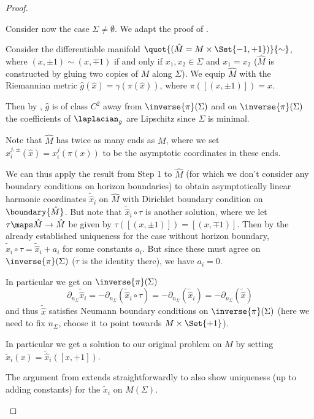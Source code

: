 \documentclass[titlepage,numbers=noenddot,headinclude,oneside,%
footinclude=true,cleardoublepage=empty,%
BCOR=5mm,paper=a4,fontsize=11pt,%
english,%
]{scrartcl}
\begin{document}
\begin{proof}
\begin{proofenumerate}[label=\textbf{Step \arabic*.}]
        \item Consider now the case \( \Sigma\neq \emptyset \). We adapt the proof of \cite[Proposition 46]{eichmairDoublingAsymptoticallyFlat2023}.

        Consider the differentiable manifold \( \quot{(\hat{M}=M\times \Set{-1,+1})}{\sim} \), where \( (x,\pm 1)\sim (x,\mp 1) \) if and only if \( x_1,x_2\in \Sigma \) and \( x_1=x_2 \) (\ie \( \hat{M} \) is constructed by gluing two copies of \( M \) along \( \Sigma \)). We equip \( \hat{M} \) with the Riemannian metric \( \hat{g}(\hat{x})=\gamma(\pi(\hat{x})) \), where \( \pi([(x,\pm 1)])=x \).
        
        Then by \cite[Lemma 19]{eichmairDoublingAsymptoticallyFlat2023}, \( \hat{g} \) is of class \( C^2 \) away from \( \inverse{\pi}(\Sigma) \) and on \( \inverse{\pi}(\Sigma) \) the coefficients of \( \laplacian_{\tilde{g}} \) are Lipschitz since \( \Sigma \) is minimal.

        Note that \( \hat{M} \) has twice as many ends as \( M \), where we set \( \hat{x}_{i}^{j,\pm}(\hat{x})=x_i^j(\pi(x)) \) to be the asymptotic coordinates in these ends.

        We can thus apply the result from Step 1 to \( \hat{M} \) (for which we don't consider any boundary conditions on horizon boundaries) to obtain asymptotically linear harmonic coordinates \( \tilde{\hat{x}}_i \) on \( \hat{M} \) with Dirichlet boundary condition on \( \boundary{\hat{M}} \). But note that \( \tilde{\hat{x}}_i\circ \tau \) is another solution, where we let \( \tau\maps \hat{M}\to \hat{M} \) be given by \( \tau([(x,\pm 1)])=[(x,\mp 1)] \). Then by the already established uniqueness for the case without horizon boundary, \( \tilde{\hat{x}}_i\circ \tau=\tilde{\hat{x}}_i+a_i \) for some constants \( a_i \). But since these must agree on \( \inverse{\pi}(\Sigma) \) (\( \tau \) is the identity there), we have \( a_i=0 \).
        
        In particular we get on \( \inverse{\pi}(\Sigma) \)
        \begin{equation*}
            \partial_{n_{\Sigma}}\tilde{\hat{x}}_i=-\partial_{n_\Sigma}(\tilde{\hat{x}}_i\circ \tau)=-\partial_{n_\Sigma}(\tilde{\hat{x}}_i)=-\partial_{n_\Sigma}(\tilde{\hat{x}})
        \end{equation*}
        and thus \( \tilde{\hat{x}} \) satisfies Neumann boundary conditions on \( \inverse{\pi}(\Sigma) \) (here we need to fix \( n_{\Sigma} \), \eg choose it to point towards \( M\times \Set{+1} \)).

        In particular we get a solution to our original problem on \( M \) by setting \( \tilde{x}_i(x)=\tilde{\hat{x}}_i([x,+1]) \).

        The argument from \cite[Proposition 3.9]{eichmairDoublingAsymptoticallyFlat2023} extends straightforwardly to also show uniqueness (up to adding constants) for the \( \tilde{x}_i \) on \( M(\Sigma) \).  
    \end{proofenumerate}
\end{proof}
\end{document}
